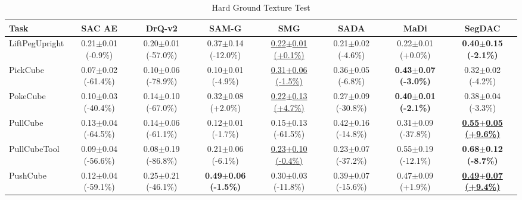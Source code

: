 \begin{table}[htbp]
\centering
\scriptsize
\caption{Hard Ground Texture Test}
\label{tab:appendix_groundtexturetest_hard}
\begin{adjustbox}{max width=\textwidth}
\begin{tabular}{l*{7}{c}}
\toprule
\textbf{Task} & \textbf{SAC AE} & \textbf{DrQ-v2} & \textbf{SAM-G} & \textbf{SMG} & \textbf{SADA} & \textbf{MaDi} & \textbf{SegDAC} \\
\midrule
LiftPegUpright & 0.21$\pm$0.01 \scriptsize{(-0.9\%)} & 0.20$\pm$0.01 \scriptsize{(-57.0\%)} & 0.37$\pm$0.14 \scriptsize{(-12.0\%)} & \underline{0.22$\pm$0.01 \scriptsize{(+0.1\%)}} & 0.21$\pm$0.02 \scriptsize{(-4.6\%)} & 0.22$\pm$0.01 \scriptsize{(+0.0\%)} & \textbf{0.40$\pm$0.15 \scriptsize{(-2.1\%)}} \\
PickCube & 0.07$\pm$0.02 \scriptsize{(-61.4\%)} & 0.10$\pm$0.06 \scriptsize{(-78.9\%)} & 0.10$\pm$0.01 \scriptsize{(-4.9\%)} & \underline{0.31$\pm$0.06 \scriptsize{(-1.5\%)}} & 0.36$\pm$0.05 \scriptsize{(-6.8\%)} & \textbf{0.43$\pm$0.07 \scriptsize{(-3.0\%)}} & 0.32$\pm$0.02 \scriptsize{(-4.2\%)} \\
PokeCube & 0.10$\pm$0.03 \scriptsize{(-40.4\%)} & 0.14$\pm$0.10 \scriptsize{(-67.0\%)} & 0.32$\pm$0.08 \scriptsize{(+2.0\%)} & \underline{0.22$\pm$0.13 \scriptsize{(+4.7\%)}} & 0.27$\pm$0.09 \scriptsize{(-30.8\%)} & \textbf{0.40$\pm$0.01 \scriptsize{(-2.1\%)}} & 0.38$\pm$0.04 \scriptsize{(-3.3\%)} \\
PullCube & 0.13$\pm$0.04 \scriptsize{(-64.5\%)} & 0.14$\pm$0.06 \scriptsize{(-61.1\%)} & 0.12$\pm$0.01 \scriptsize{(-1.7\%)} & 0.15$\pm$0.13 \scriptsize{(-61.5\%)} & 0.42$\pm$0.16 \scriptsize{(-14.8\%)} & 0.31$\pm$0.09 \scriptsize{(-37.8\%)} & \textbf{\underline{0.55$\pm$0.05 \scriptsize{(+9.6\%)}}} \\
PullCubeTool & 0.09$\pm$0.04 \scriptsize{(-56.6\%)} & 0.08$\pm$0.19 \scriptsize{(-86.8\%)} & 0.21$\pm$0.06 \scriptsize{(-6.1\%)} & \underline{0.23$\pm$0.10 \scriptsize{(-0.4\%)}} & 0.23$\pm$0.07 \scriptsize{(-37.2\%)} & 0.55$\pm$0.19 \scriptsize{(-12.1\%)} & \textbf{0.68$\pm$0.12 \scriptsize{(-8.7\%)}} \\
PushCube & 0.12$\pm$0.04 \scriptsize{(-59.1\%)} & 0.25$\pm$0.21 \scriptsize{(-46.1\%)} & \textbf{0.49$\pm$0.06 \scriptsize{(-1.5\%)}} & 0.30$\pm$0.03 \scriptsize{(-11.8\%)} & 0.39$\pm$0.07 \scriptsize{(-15.6\%)} & 0.47$\pm$0.09 \scriptsize{(+1.9\%)} & \textbf{\underline{0.49$\pm$0.07 \scriptsize{(+9.4\%)}}} \\

\end{tabular}
\end{adjustbox}
\end{table}
